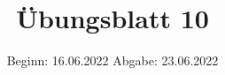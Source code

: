 

\title{Übungsblatt 10}
\date{%
  Beginn: 16.06.2022
  \hspace{3em}
  Abgabe: 23.06.2022
}



\maketitle
\thispagestyle{empty}
\tableofcontents
\newpage







